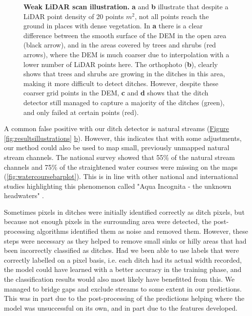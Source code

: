 \documentclass[11pt, review]{elsarticle} %
\begin{document}
\begin{figure}[!htb]
    \caption{\textbf{Weak LiDAR scan illustration.} \textbf{a} and \textbf{b} illustrate that despite a LiDAR point density of 20 points $m^2$, not all points reach the ground in places with dense vegetation. In \textbf{a} there is a clear difference between the smooth surface of the DEM in the open area (black arrow), and in the areas covered by trees and shrubs (red arrows), where the DEM is much coarser due to interpolation with a lower number of LiDAR points here. The orthophoto (\textbf{b}), clearly shows that trees and shrubs are growing in the ditches in this area, making it more difficult to detect ditches. However, despite these coarser grid points in the DEM, \textbf{c} and \textbf{d} shows that the ditch detector still managed to capture a majority of the ditches (green), and only failed at certain points (red).}
    \label{fig:resultstreesbushes}
\end{figure}
\clearpage

A common false positive with our ditch detector is natural streams (\hyperref[fig:resultsillustrations]{Figure} \ref{fig:resultsillustrations} \hyperref[fig:resultsillustrations]{b}). However, this indicates that with some adjustments, our method could also be used to map small, previously unmapped natural stream channels. The national survey showed that 55\% of the natural stream channels and 75\% of the straightened water courses were missing on the maps (\autoref{fig:watercoursebarplot}). This is in line with other national \citep{kuglerova} and international \citep{benstead} studies highlighting this phenomenon called "Aqua Incognita - the unknown headwaters" \citep{bishop,kuglerova}.

Sometimes pixels in ditches were initially identified correctly as ditch pixels, but because not enough pixels in the surrounding area were detected, the post-processing algorithms identified them as noise and removed them. However, these steps were necessary as they helped to remove small sinks or hilly areas that had been incorrectly classified as ditches. Had we been able to use labels that were correctly labelled on a pixel basis, i.e. each ditch had its actual width recorded, the model could have learned with a better accuracy in the training phase, and the classification results would also most likely have benefitted from this. We managed to bridge gaps and exclude streams to some extent in our predictions. This was in part due to the post-processing of the predictions helping where the model was unsuccessful on its own, and in part due to the features developed.
\end{document}
